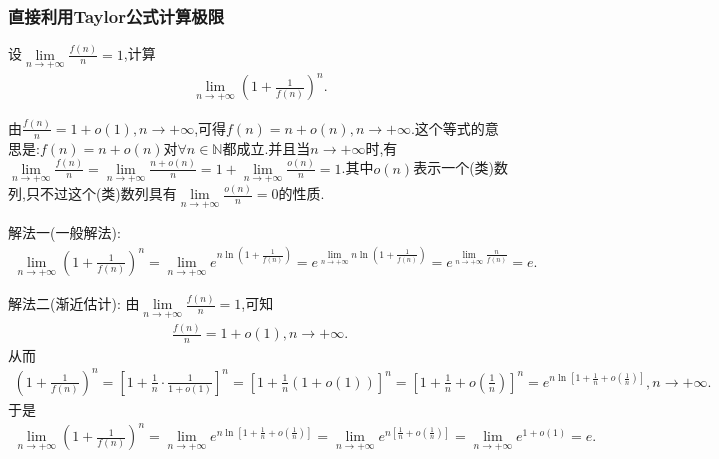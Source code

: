 \documentclass[../../main.tex]{subfiles}%
\begin{document}
\subsubsection{直接利用Taylor公式计算极限}

\begin{example}
设$\underset{n\rightarrow +\infty}{\lim}\frac{f\left( n \right)}{n}=1$,计算
\begin{align*}
\underset{n\rightarrow +\infty}{\lim}\left( 1+\frac{1}{f\left( n \right)} \right) ^n.
\end{align*}
\end{example}
\begin{note}
由$\frac{f\left( n \right)}{n}=1+o\left( 1 \right) ,n\rightarrow +\infty$,可得$f\left( n \right) =n+o\left( n \right) ,n\rightarrow +\infty$.这个等式的意思是:$f(n)=n+o(n)$对$\forall n\in \mathbb{N}$都成立.并且当$n\to +\infty$时,有$\underset{n\rightarrow +\infty}{\lim}\frac{f\left( n \right)}{n}=\underset{n\rightarrow +\infty}{\lim}\frac{n+o\left( n \right)}{n}=1+\underset{n\rightarrow +\infty}{\lim}\frac{o\left( n \right)}{n}=1
$.其中$o(n)$表示一个(类)数列,只不过这个(类)数列具有$\underset{n\rightarrow +\infty}{\lim}\frac{o\left( n \right)}{n}=0$的性质.
\end{note}
\begin{solution}

{\color{blue}解法一(一般解法):}
\begin{align*}
\underset{n\rightarrow +\infty}{\lim}\left( 1+\frac{1}{f\left( n \right)} \right) ^n=\underset{n\rightarrow +\infty}{\lim}e^{n\ln \left( 1+\frac{1}{f\left( n \right)} \right)}=e^{\underset{n\rightarrow +\infty}{\lim}n\ln \left( 1+\frac{1}{f\left( n \right)} \right)}=e^{\underset{n\rightarrow +\infty}{\lim}\frac{n}{f\left( n \right)}}=e.
\end{align*}

{\color{blue}解法二(渐近估计):}
由$\underset{n\rightarrow +\infty}{\lim}\frac{f\left( n \right)}{n}=1$,可知
\begin{align*}
\frac{f\left( n \right)}{n}=1+o\left( 1 \right) ,n\rightarrow +\infty .
\end{align*}
从而
\begin{align*}
\left( 1+\frac{1}{f\left( n \right)} \right) ^n=\left[ 1+\frac{1}{n}\cdot \frac{1}{1+o\left( 1 \right)} \right] ^n=\left[ 1+\frac{1}{n}\left( 1+o\left( 1 \right) \right) \right] ^n=\left[ 1+\frac{1}{n}+o\left( \frac{1}{n} \right) \right] ^n=e^{n\ln \left[ 1+\frac{1}{n}+o\left( \frac{1}{n} \right) \right]},n\to +\infty.
\end{align*}
于是
\begin{align*}
\underset{n\rightarrow +\infty}{\lim}\left( 1+\frac{1}{f\left( n \right)} \right) ^n=\underset{n\rightarrow +\infty}{\lim}e^{n\ln \left[ 1+\frac{1}{n}+o\left( \frac{1}{n} \right) \right]}=\underset{n\rightarrow +\infty}{\lim}e^{n\left[ \frac{1}{n}+o\left( \frac{1}{n} \right) \right]}=\underset{n\rightarrow +\infty}{\lim}e^{1+o\left( 1 \right)}=e.
\end{align*}

\end{solution}
\end{document}
